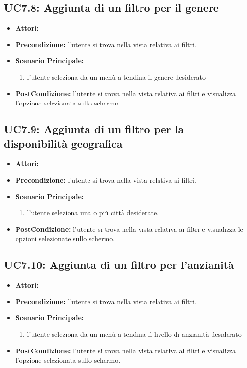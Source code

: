 \subsection{UC7.8: Aggiunta di un filtro per il genere}
\begin{itemize}
	\item \textbf{Attori:}\loggedusr
	\item \textbf{Precondizione:} l'utente si trova nella vista relativa ai filtri.
	\item \textbf{Scenario Principale:}
	\begin{enumerate}
		\item l'utente seleziona da un menù a tendina il genere desiderato
	\end{enumerate}
	\item \textbf{PostCondizione:}  l'utente si trova nella vista relativa ai filtri e visualizza l'opzione selezionata sullo schermo.
\end{itemize}

\subsection{UC7.9: Aggiunta di un filtro per la disponibilità geografica}
\begin{itemize}
	\item \textbf{Attori:}\loggedusr
	\item \textbf{Precondizione:} l'utente si trova nella vista relativa ai filtri.
	\item \textbf{Scenario Principale:}
	\begin{enumerate}
		\item l'utente seleziona una o più città desiderate.
	\end{enumerate}
	\item \textbf{PostCondizione:}  l'utente si trova nella vista relativa ai filtri e visualizza le opzioni selezionate sullo schermo.
\end{itemize}

\subsection{UC7.10: Aggiunta di un filtro per l'anzianità}
\begin{itemize}
	\item \textbf{Attori:}\loggedusr
	\item \textbf{Precondizione:} l'utente si trova nella vista relativa ai filtri.
	\item \textbf{Scenario Principale:}
	\begin{enumerate}
		\item l'utente seleziona da un menù a tendina il livello di anzianità desiderato
	\end{enumerate}
	\item \textbf{PostCondizione:}  l'utente si trova nella vista relativa ai filtri e visualizza l'opzione selezionata sullo schermo.
\end{itemize}


